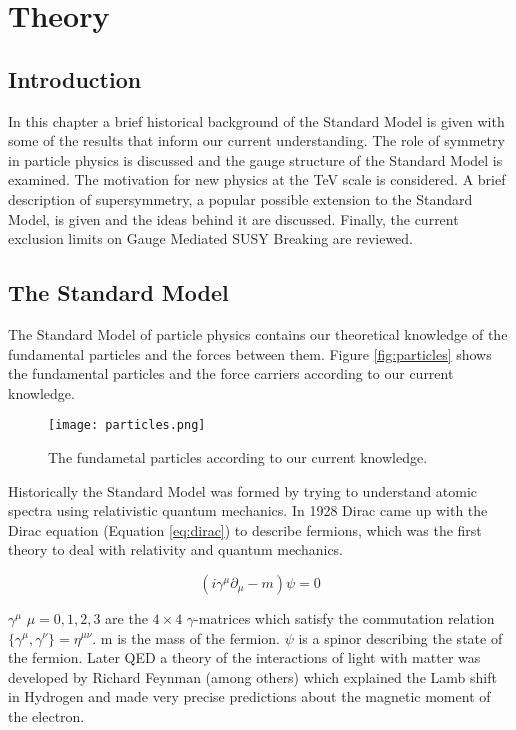 \chapter{Theory}

\section{Introduction}

In this chapter a brief historical background of the Standard Model is given
with some of the results that inform our current understanding. The role of
symmetry in particle physics is discussed and the gauge structure of the
Standard Model is examined. The motivation for new physics at the TeV scale is
considered. A brief description of supersymmetry, a popular possible extension 
to the Standard Model, is given and the ideas behind it are discussed. Finally,
the current exclusion limits on Gauge Mediated SUSY Breaking are reviewed. 

\section{The Standard Model}

The Standard Model of particle physics contains our theoretical knowledge of the
fundamental particles and the forces between them. Figure \ref{fig:particles}
shows the fundamental particles and the force carriers according to our current
knowledge. \\

\begin{figure}
\begin{center}
\texttt{[image: particles.png]}
\end{center}
\caption{The fundametal particles according to our current knowledge.}
\end{figure}

Historically the Standard Model was formed by trying to understand atomic
spectra using relativistic quantum mechanics. In 1928 Dirac came up with the
Dirac equation (Equation \ref{eq:dirac}) to describe fermions, which was the 
first theory to deal with relativity and quantum mechanics. 

\begin{equation}
\left(i\gamma^{\mu}\partial_{\mu} - m\right)\psi = 0
\label{eq:dirac}
\end{equation}

$\gamma^{\mu}$ $\mu = 0, 1, 2, 3$ are the $4\times4$ $\gamma$-matrices which 
satisfy the commutation relation $\{\gamma^{\mu},\gamma^{\nu}\} = \eta^{\mu\nu}$. 
m is the mass of the fermion. $\psi$ is a spinor describing the state of the 
fermion. Later QED a theory of the interactions of light with matter was developed 
by Richard Feynman (among others) which explained the Lamb shift in Hydrogen and 
made very precise predictions about the magnetic moment of the electron. \\

